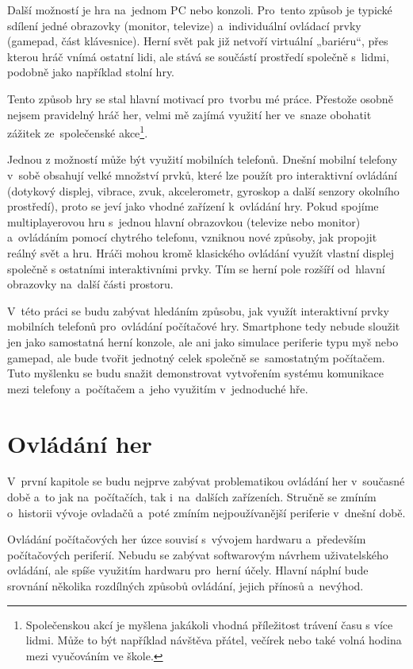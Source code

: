 \documentclass[thesis=B,czech,hidelinks]{FITthesis}[2012/06/26] %
\begin{document}
\begin{introduction}
Další možností je hra na~jednom PC nebo konzoli. Pro~tento způsob je typické sdílení jedné obrazovky (monitor, televize) a~individuální ovládací prvky (gamepad, část klávesnice). Herní svět pak již netvoří virtuální „bariéru“, přes kterou hráč vnímá ostatní lidi, ale stává se součástí prostředí společně s~lidmi, podobně jako například stolní hry.

Tento způsob hry se stal hlavní motivací pro~tvorbu mé práce. Přestože osobně nejsem pravidelný hráč her, velmi mě zajímá využití her ve~snaze obohatit zážitek ze~společenské akce\footnote{Společenskou akcí je myšlena jakákoli vhodná příležitost trávení času s více lidmi. Může to být například návštěva přátel, večírek nebo také volná hodina mezi vyučováním ve škole.}. 

Jednou z možností může být využití mobilních telefonů. Dnešní mobilní telefony v~sobě obsahují velké množství prvků, které lze použít pro interaktivní ovládání (dotykový displej, vibrace, zvuk, akcelerometr, gyroskop a další senzory okolního prostředí), proto se jeví jako vhodné zařízení k~ovládání hry. Pokud spojíme multiplayerovou hru s~jednou hlavní obrazovkou (televize nebo monitor) a~ovládáním pomocí chytrého telefonu, vzniknou nové způsoby, jak propojit reálný svět a hru. Hráči mohou kromě klasického ovládání využít vlastní displej společně s ostatními interaktivními prvky. Tím se herní pole rozšíří od~hlavní obrazovky na~další části prostoru.

V~této práci se budu zabývat hledáním způsobu, jak využít interaktivní prvky mobilních telefonů pro~ovládání počítačové hry. Smartphone tedy nebude sloužit jen jako samostatná herní konzole, ale ani jako simulace periferie typu myš nebo gamepad, ale bude tvořit jednotný celek společně se~samostatným počítačem. Tuto myšlenku se budu snažit demonstrovat vytvořením systému komunikace mezi telefony a~počítačem a~jeho využitím v~jednoduché hře. 

\end{introduction}

\chapter{Ovládání her}

V~první kapitole se budu nejprve zabývat problematikou ovládání her v~současné době a~to jak na~počítačích, tak i~na~dalších zařízeních. Stručně se zmíním o~historii vývoje ovladačů a~poté zmíním nejpoužívanější periferie v~dnešní době.
 
Ovládání počítačových her úzce souvisí s~vývojem hardwaru a~především počítačových periferií. Nebudu se zabývat softwarovým návrhem uživatelského ovládání, ale spíše využitím hardwaru pro~herní účely. Hlavní náplní bude srovnání několika rozdílných způsobů ovládání, jejich přínosů a~nevýhod. 
\end{document}
